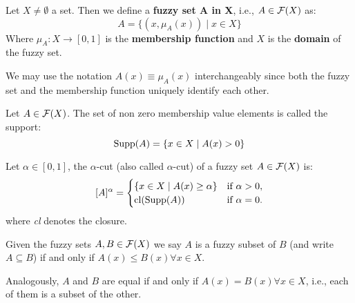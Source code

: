
\begin{definition}
    Let $X\neq\emptyset$ a set. Then we define a \textbf{fuzzy set A in X}, i.e., $A \in \mathcal{F}(X)$ as:
    \[A=\{(x,\mu_A(x))\mid x\in X\}\]
    Where $\mu_A:X\longrightarrow [0,1]$ is the \textbf{membership function} and $X$ is the \textbf{domain} of the fuzzy set.
\end{definition}

\begin{remark}
    We may use the notation \( A(x) \equiv \mu_A(x) \) interchangeably since both the fuzzy set and the membership function uniquely identify each other.
\end{remark}

\begin{definition}[Support]
    Let $A \in \mathcal{F}(X)$. The set of non zero membership value elements is called the support:
    \[\textnormal{Supp}(A)=\{x\in X \mid A(x)>0\}\]
\end{definition}

\begin{definition}
    Let $\alpha \in [0,1]$, the $\alpha$-cut (also called $\alpha$-cut) of a fuzzy set \( A \in \mathcal{F}(X)\) is:
    \[
    [A]^\alpha =
    \begin{cases}
    \{x \in X \mid A(x)\geq \alpha\} & \text{if } \alpha > 0, \\
    \textnormal{cl}(\textnormal{Supp}(A)) & \text{if } \alpha = 0.
    \end{cases}
    \]
    where \textit{cl} denotes the closure.
\end{definition}



\begin{definition}
    Given the fuzzy sets $A, B \in \mathcal{F}(X)$ we say $A$ is a fuzzy subset of $B$ (and write $A \subseteq B$) if and only if $A(x)
    \leq B(x) \forall x \in X$.

    Analogously, $A$ and $B$ are equal if and only if $A(x)=B(x) \forall x \in X$, i.e., each of them is a subset of the other.
\end{definition}


